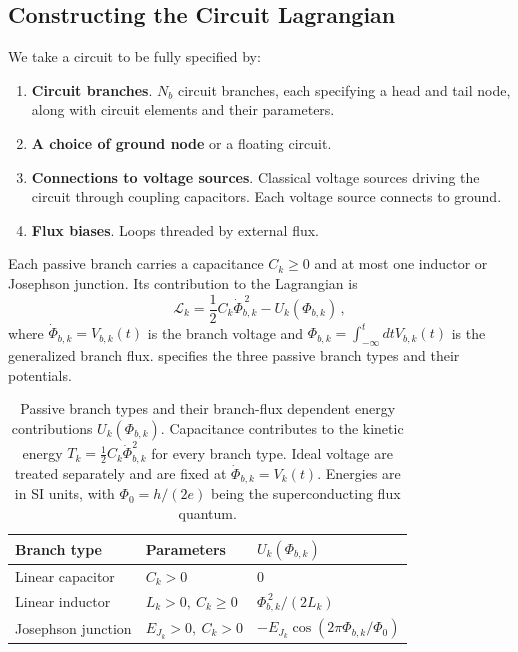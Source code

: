 \subsection{Constructing the Circuit Lagrangian}

We take a circuit to be fully specified by:
\begin{enumerate}
    \item {\bf Circuit branches}. $N_b$ circuit branches, each specifying a head and tail node, along with circuit elements and their parameters.
    \item {\bf A choice of ground node} or a floating circuit.
    \item {\bf Connections to voltage sources}. Classical voltage sources driving the circuit through coupling capacitors. Each voltage source connects to ground.
    \item {\bf Flux biases}. Loops threaded by external flux.
\end{enumerate}
Each passive branch carries a capacitance $C_k \geq 0$ and at most one inductor or Josephson junction.
Its contribution to the Lagrangian is
\begin{equation}
    \mathcal{L}_k = \frac{1}{2}C_k\dot\Phi_{b,k}^{\,2} - U_k(\Phi_{b,k}) \, ,
    \label{eq:branch_lagrangian_main}
\end{equation}
where $\dot\Phi_{b,k} = V_{b,k}(t)$ is the branch voltage and $\Phi_{b,k}  = \int_{-\infty}^t dt V_{b,k}(t)$ is the generalized branch flux.
 specifies the three passive branch types and their potentials.

\begin{table}[t]
\centering
\footnotesize
\setlength{\tabcolsep}{3pt}
\renewcommand{\arraystretch}{1.25}
\begin{tabular*}{\columnwidth}{@{\extracolsep{\fill}}lll@{}}
\toprule
Branch type & Parameters & $U_k(\Phi_{b,k})$ \\
\midrule
Linear capacitor & $C_k>0$ & $0$ \\[3pt]
Linear inductor & $L_k>0,\ C_k\geq0$ & $\Phi_{b,k}^{\,2}/(2L_k)$ \\[3pt]
Josephson junction & $E_{J_k}>0,\ C_k>0$ & $-E_{J_k}\cos(2\pi\Phi_{b,k}/\Phi_0)$ \\
\bottomrule
\end{tabular*}
\caption{Passive branch types and their branch-flux dependent energy contributions $U_k(\Phi_{b,k})$.
Capacitance contributes to the kinetic energy $T_{k} = \tfrac{1}{2}C_k\dot \Phi_{b,k}^2$ for every branch type.
Ideal voltage are treated separately and are fixed at $\dot\Phi_{b,k}=V_k(t)$.
Energies are in SI units, with $\Phi_0=h/(2e)$ being the superconducting flux quantum.}
\label{tab:branch_types}
\end{table}

